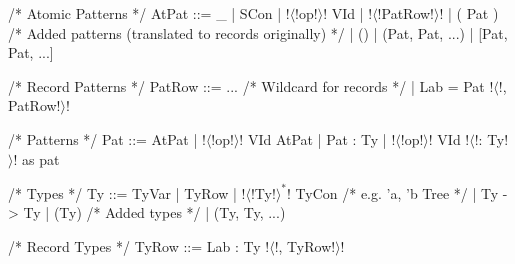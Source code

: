 \documentclass[a4paper,11pt]{article}
\begin{document}
\begin{grm}
/* Atomic Patterns */
AtPat ::= _ 
        | SCon
        | !$\langle$!op!$\rangle$! VId 
        | { !$\langle$!PatRow!$\rangle$! }
        | ( Pat )
        /* Added patterns (translated to records originally) */
        | ()
        | (Pat, Pat, ...)
        | [Pat, Pat, ...]

/* Record Patterns */
PatRow ::= ... /* Wildcard for records */
         | Lab = Pat !$\langle$!, PatRow!$\rangle$!

/* Patterns */
Pat ::= AtPat
      | !$\langle$!op!$\rangle$! VId AtPat
      | Pat : Ty
      | !$\langle$!op!$\rangle$! VId !$\langle$!: Ty!$\rangle$! as pat

/* Types */
Ty ::= TyVar
     | { TyRow }
     | !$\langle$!Ty!$\rangle^*$! TyCon /* e.g. 'a, 'b Tree */
     | Ty -> Ty
     | (Ty)
     /* Added types */
     | (Ty, Ty, ...)

/* Record Types */
TyRow ::= Lab : Ty !$\langle$!, TyRow!$\rangle$!
\end{grm}
\end{document}
